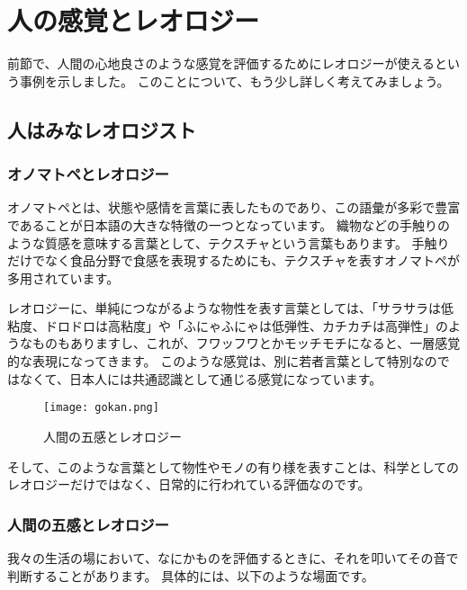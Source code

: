 \documentclass[uplatex,dvipdfmx,a4paper,11pt]{jsarticle}
\begin{document}
\section{人の感覚とレオロジー}
\label{sec:1_kankaku}

前節で、人間の心地良さのような感覚を評価するためにレオロジーが使えるという事例を示しました。
このことについて、もう少し詳しく考えてみましょう。

\subsection{人はみなレオロジスト}

\subsubsection{オノマトペとレオロジー}

オノマトペとは、状態や感情を言葉に表したものであり、この語彙が多彩で豊富であることが日本語の大きな特徴の一つとなっています。
織物などの手触りのような質感を意味する言葉として、テクスチャという言葉もあります。
手触りだけでなく食品分野で食感を表現するためにも、テクスチャを表すオノマトペが多用されています。

レオロジーに、単純につながるような物性を表す言葉としては、「サラサラは低粘度、ドロドロは高粘度」や「ふにゃふにゃは低弾性、カチカチは高弾性」のようなものもありますし、これが、フワッフワとかモッチモチになると、一層感覚的な表現になってきます。
このような感覚は、別に若者言葉として特別なのではなくて、日本人には共通認識として通じる感覚になっています。
\begin{figure}[htb]
	\begin{center}
		\texttt{[image: gokan.png]}
		\caption{人間の五感とレオロジー}
		\label{gokan}
	\end{center}
\end{figure}

そして、このような言葉として物性やモノの有り様を表すことは、科学としてのレオロジーだけではなく、日常的に行われている評価なのです。

\subsubsection{人間の五感とレオロジー}

我々の生活の場において、なにかものを評価するときに、それを叩いてその音で判断することがあります。
具体的には、以下のような場面です。
\end{document}
